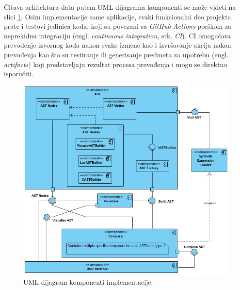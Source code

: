 Čitava arhitektura data putem UML dijagrama komponenti se može videti na slici \ref{fig:ImplementationComponents}. Osim implementacije same aplikacije, svaki funkcionalni deo projekta prate i testovi jedinica koda, koji su povezani sa \emph{GitHub Actions} porškom za neprekidnu integraciju (engl. \emph{continuous integration}, srk. \emph{CI}). CI omogućava prevođenje izvornog koda nakon svake izmene kao i izvršavanje akcija nakon prevođenja kao što su testiranje ili generisanje predmeta za upotrebu (engl. \emph{artifacts}) koji predstavljaju rezultat procesa prevođenja i mogu se direktno isporučiti.

\begin{figure}[h!]
\centering
\includegraphics[scale=0.8]{images/uml/ComponentDiagram.png}
\caption{UML dijagram komponenti implementacije.}
\label{fig:ImplementationComponents}
\end{figure}









